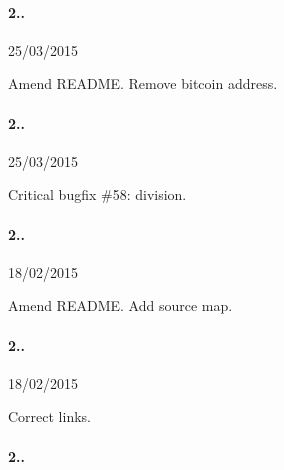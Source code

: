 \paragraph*{2..}


\begin{DoxyItemize}
\item 25/03/2015
\item Amend R\+E\+A\+D\+M\+E. Remove bitcoin address.
\end{DoxyItemize}

\paragraph*{2..}


\begin{DoxyItemize}
\item 25/03/2015
\item Critical bugfix \#58\+: division.
\end{DoxyItemize}

\paragraph*{2..}


\begin{DoxyItemize}
\item 18/02/2015
\item Amend R\+E\+A\+D\+M\+E. Add source map.
\end{DoxyItemize}

\paragraph*{2..}


\begin{DoxyItemize}
\item 18/02/2015
\item Correct links.
\end{DoxyItemize}

\paragraph*{2..}


